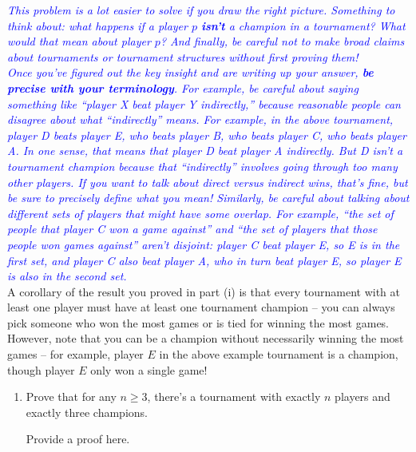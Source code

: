 \documentclass{article}
\renewcommand{\(}{\left(}
\renewcommand{\)}{\right)}
\theoremstyle{plain}
\theoremstyle{plain}
\theoremstyle{definition}
\renewcommand{\emph}[1]{\textit{\textbf{#1}}}
\newcommand{\annotate}[1]{\textit{\textcolor{blue}{#1}}}
\begin{document}
\annotate{This problem is a lot easier to solve if you draw the right picture. Something to think about: what happens if a player $p$ \emph{isn't} a champion in a tournament? What would that mean about player $p$? And finally, be careful not to make broad claims about tournaments or tournament structures without first proving them!} \\

\annotate{Once you've figured out the key insight and are writing up your answer, \emph{be precise with your terminology}. For example, be careful about saying something like ``player X beat player Y indirectly,'' because reasonable people can disagree about what ``indirectly'' means. For example, in the above tournament, player D beats player E, who beats player B, who beats player C, who beats player A. In one sense, that means that player D beat player A indirectly. But D isn't a tournament champion because that ``indirectly'' involves going through too many other players. If you want to talk about direct versus indirect wins, that's fine, but be sure to precisely define what you mean! Similarly, be careful about talking about different sets of players that might have some overlap. For example, ``the set of people that player C won a game against'' and ``the set of players that those people won games against'' aren't disjoint: player C beat player E, so E is in the first set, and player C also beat player A, who in turn beat player E, so player E is also in the second set.} \\

A corollary of the result you proved in part (i) is that every tournament with at least one player must have at least one tournament champion -- you can always pick someone who won the most games or is tied for winning the most games. However, note that you can be a champion without necessarily winning the most games -- for example, player $E$ in the above example tournament is a champion, though player $E$ only won a single game! \\

\begin{enumerate}[resume*]

    \item Prove that for any $n \geq 3$, there's a tournament with exactly $n$ players and exactly three champions.

    \begin{shaded}
    Provide a proof here.
    \end{shaded}
\end{enumerate}
\end{document}
